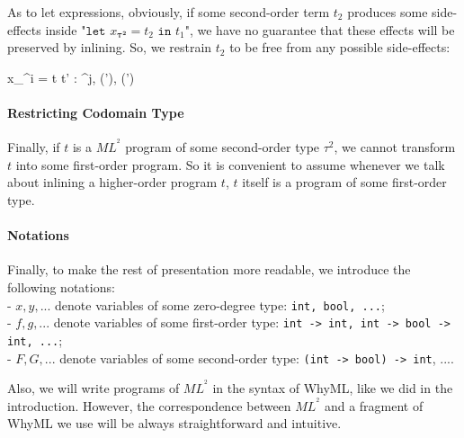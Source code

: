 \documentclass[a4paper,11pt,oneside]{article}
\theoremstyle{plain}
\newcommand{\bwedge}{\boldsymbol{~\wedge~}}
\newcommand{\bvee}{\boldsymbol{~\vee~}}
\newcommand{\inlsrc}{\textit{ML}^{^2}}
\begin{document}
	
As to let expressions, obviously, if some second-order term $t_2$ produces some side-effects inside "$\texttt{let } x_{\boldsymbol{\tau^{2}}} = t_2 \texttt{ in } t_1 $", we have no guarantee that these effects will be preserved by inlining. 
So, we restrain $t_2$ to be free from any possible side-effects:
\hypertarget{restr-let-f}{}
	\begin{footnotesize}
		\infrule[T$_{ML^{^2}}$-Let] 
			{\vdash t : \tau^i, \theta, \rho 
			\qquad \vdash t' : \tau^j, \theta', \rho' 
			\qquad \textcolor{red}{(i = 2) \Rightarrow 
			\boldsymbol{(\theta = \bot_{\theta}\bwedge \rho = \bot_{\rho})}}} 
			{\vdash {} x_{\tau^i} = t  t' 
				: \tau^{j}, 
				(\theta \bvee \theta'), 
				(\rho \bvee \rho')}
	\end{footnotesize}
\paragraph{Restricting Codomain Type}
	Finally, if $t$ is a $\inlsrc$ program of some second-order type $\tau^2$, we cannot  transform $t$ into some first-order program. 
	So it is convenient to assume whenever we talk about inlining a higher-order program $t$, $t$ itself is a program of some first-order type.

\paragraph{Notations}

	Finally, to make the rest of presentation more readable, we introduce the following notations:\\
 \hspace*{0.5cm} - $x,y,...$ denote variables of some zero-degree type: \texttt{int, bool, ...};\\
 \hspace*{0.5cm} - $f,g,...$ denote variables of some first-order type: \texttt{int -> int, int -> bool -> int, ...};\\ 
 \hspace*{0.5cm} - $F,G,...$ denote variables of some second-order type: \texttt{(int -> bool) -> int}, ....

\noindent	Also, we will write programs of $\inlsrc$ in the syntax of WhyML, like we did in the introduction. 
	However, the correspondence between $\inlsrc$ and a fragment of WhyML we use will be always straightforward and intuitive.
	
\newpage
\end{document}
